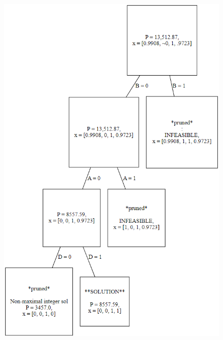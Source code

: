 \documentclass[11pt]{article}
\begin{document}
\begin{enumerate}
\begin{enumerate}
        \begin{figure}[h]
            \centering
            \includegraphics[scale=.9]{unknown.png}
        \end{figure}





    \end{enumerate}


\end{enumerate}
\end{document}
